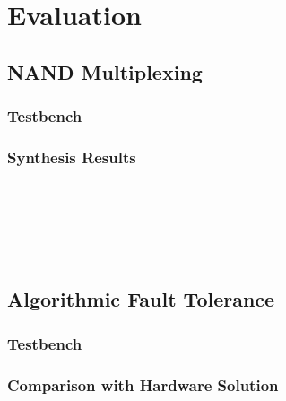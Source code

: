 
\section{Evaluation}
\label{sec:eval}

\subsection{NAND Multiplexing}
\label{sec:eval-nand}

\subsubsection{Testbench}
\label{sec:nand-test}

\subsubsection{Synthesis Results}
\label{sec:nand-syn}

 \\
\label{sec:syn-util}

 \\
\label{sec:syn-time}

 \\
\label{sec:syn-pow}


\subsection{Algorithmic Fault Tolerance}
\label{sec:eval-aft}

\subsubsection{Testbench}
\label{sec:aft-test}

\subsubsection{Comparison with Hardware Solution}
\label{sec:aft-comp}